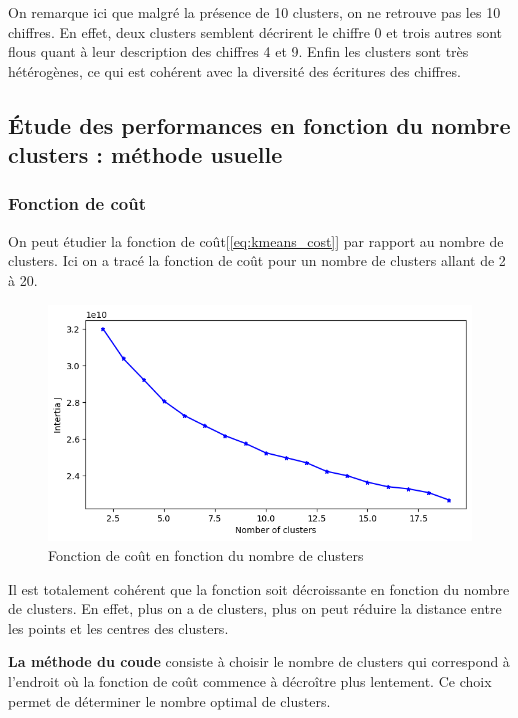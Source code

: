 \documentclass[french,a4paper,18pt]{article}
\begin{document}
On remarque ici que malgré la présence de 10 clusters, on ne retrouve pas les 10 chiffres.
En effet, deux clusters semblent décrirent le chiffre 0 et trois autres sont flous quant à leur description des chiffres 4 et 9.
Enfin les clusters sont très hétérogènes, ce qui est cohérent avec la diversité des écritures des chiffres.

\subsection{Étude des performances en fonction du nombre clusters : méthode usuelle}

\subsubsection{Fonction de coût}
On peut étudier la fonction de coût[\ref{eq:kmeans_cost}] par rapport au nombre de clusters.
Ici on a tracé la fonction de coût pour un nombre de clusters allant de 2 à 20.

\begin{figure}[h!]
    \centering
    \includegraphics[scale=0.4]{images/mnist_kmeans_inertia.png}
    \caption{Fonction de coût en fonction du nombre de clusters}\label{fig:mnist_kmeans_cost}
\end{figure}

Il est totalement cohérent que la fonction soit décroissante en fonction du nombre de clusters.
En effet, plus on a de clusters, plus on peut réduire la distance entre les points et les centres des clusters.

\textbf{La méthode du coude} consiste à choisir le nombre de clusters qui correspond à l'endroit où la fonction de coût commence à décroître plus lentement.
Ce choix permet de déterminer le nombre optimal de clusters.
\end{document}
